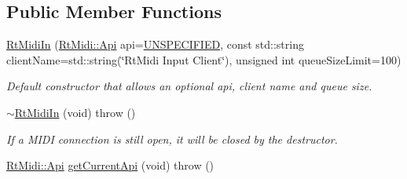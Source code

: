 \subsection*{Public Member Functions}
\begin{DoxyCompactItemize}
\item 
\hyperlink{class_rt_midi_in_aeeaeed8dae387dffc70e73e6e88b4d1a}{Rt\+Midi\+In} (\hyperlink{class_rt_midi_aac66af04a85fe5c5f07c360574a19406}{Rt\+Midi\+::\+Api} api=\hyperlink{class_rt_midi_aac66af04a85fe5c5f07c360574a19406a4a4d9f7a38a082d6b0d5dd2b5de94ab9}{U\+N\+S\+P\+E\+C\+I\+F\+I\+ED}, const std\+::string client\+Name=std\+::string(\char`\"{}Rt\+Midi Input Client\char`\"{}), unsigned int queue\+Size\+Limit=100)
\begin{DoxyCompactList}\small\item\em Default constructor that allows an optional api, client name and queue size. \end{DoxyCompactList}\item 
\hyperlink{class_rt_midi_in_ae79f4da8a1b2e7efecdd1047670b27dc}{$\sim$\+Rt\+Midi\+In} (void)  throw ()\hypertarget{class_rt_midi_in_ae79f4da8a1b2e7efecdd1047670b27dc}{}\label{class_rt_midi_in_ae79f4da8a1b2e7efecdd1047670b27dc}

\begin{DoxyCompactList}\small\item\em If a M\+I\+DI connection is still open, it will be closed by the destructor. \end{DoxyCompactList}\item 
\hyperlink{class_rt_midi_aac66af04a85fe5c5f07c360574a19406}{Rt\+Midi\+::\+Api} \hyperlink{class_rt_midi_in_a6475a11eeb0c8bf22157c3887b100164}{get\+Current\+Api} (void)  throw ()\hypertarget{class_rt_midi_in_a6475a11eeb0c8bf22157c3887b100164}{}\label{class_rt_midi_in_a6475a11eeb0c8bf22157c3887b100164}


\end{DoxyCompactItemize}
